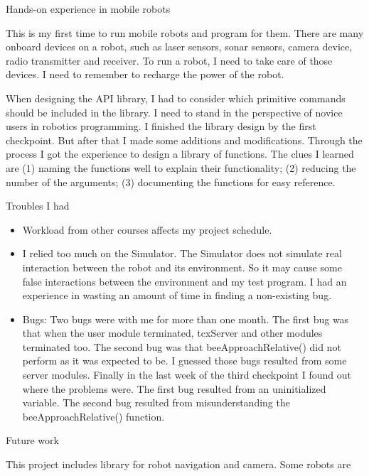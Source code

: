 {\begin{itemize}{\bf \item Hands-on experience in mobile robots}
  \end{itemize}\par This is my first time to run mobile robots and
program for them. There are many onboard devices on a robot, such as
laser sensors, sonar sensors, camera device, radio transmitter and
receiver. To run a robot, I need to take care of those devices. I need
to remember to recharge the power of the robot. \par \par When
designing the API library, I had to consider which primitive commands
should be included in the library. I need to stand in the perspective
of novice users in robotics programming. I finished the library design
by the first checkpoint. But after that I made some additions and
modifications. Through the process I got the experience to design a
library of functions. The clues I learned are (1) naming the functions
well to explain their functionality; (2) reducing the number of the
arguments; (3) documenting the functions for easy reference. \par \par
\par \par Troubles I had\par \begin{itemize}\item Workload from other
  courses affects my project schedule. \item  I relied too much
  on the Simulator. The Simulator does not simulate real interaction
  between the robot and its environment. So it may cause some false
  interactions between the environment and my test program. I had an
  experience in wasting an amount of time in finding a non-existing
  bug. \item  Bugs: Two bugs were with me for more than one
  month. The first bug was that when the user module terminated,
  tcxServer and other modules terminated too. The second bug was that
  beeApproachRelative() did not perform as it was expected to be. I
  guessed those bugs resulted from some server modules. Finally in the
  last week of the third checkpoint I found out where the problems
  were. The first bug resulted from an uninitialized variable. The
  second bug resulted from misunderstanding the beeApproachRelative()
  function. \end{itemize}\par Future work\par \par This project
includes library for robot navigation and camera. Some robots are
}
